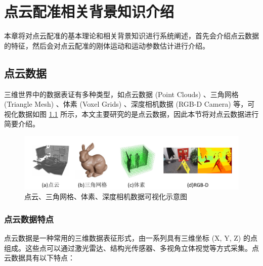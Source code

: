 %
%
%
%
%

\chapter{点云配准相关背景知识介绍}
本章将对点云配准的基本理论和相关背景知识进行系统阐述，首先会介绍点云数据的特征，然后会对点云配准的刚体运动和运动参数估计进行介绍。

\section{点云数据}
三维世界中的数据表证有多种类型，如点云数据 (Point Clouds) \cite{leberl2010point} 、三角网格 (Triangle Mesh) \cite{jiang2020local} 、体素 (Voxel Grids) \cite{guan2020voxel} 、深度相机数据 (RGB-D Camera) \cite{cruz2012kinect} 等，可视化数据如图 \ref{fig:3ddata} 所示，本文主要研究的是点云数据，因此本节将对点云数据进行简要介绍。

\begin{figure}[ht]
    \vspace{-8mm}
    \includegraphics[width=\textwidth]{images/3ddata.pdf}
    \caption{点云、三角网格、体素、深度相机数据可视化示意图}
    \label{fig:3ddata}
    \vspace{-10mm}
\end{figure}


\subsection{点云数据特点}
点云数据是一种常用的三维数据表征形式，由一系列具有三维坐标 (X, Y, Z) 的点组成。这些点可以通过激光雷达、结构光传感器、多视角立体视觉等方式采集。点云数据具有以下特点：

